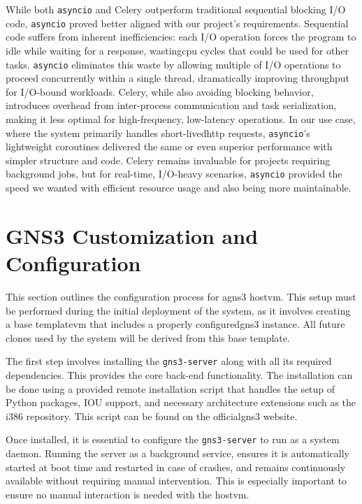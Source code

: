         While both \texttt{asyncio} and Celery outperform traditional sequential blocking I/O code, \texttt{asyncio} proved better 
        aligned with our project's requirements. Sequential code suffers from inherent inefficiencies: each I/O 
        operation forces the program to idle while waiting for a response, wasting\ac{cpu} cycles that could be used 
        for other tasks. \texttt{asyncio} eliminates this waste by allowing multiple of I/O operations to proceed 
        concurrently within a single thread, dramatically improving throughput for I/O-bound workloads. Celery, 
        while also avoiding blocking behavior, introduces overhead from inter-process communication and task 
        serialization, making it less optimal for high-frequency, low-latency operations. In our use case, where the 
        system primarily handles short-lived\ac{http} requests, \texttt{asyncio}'s lightweight coroutines delivered the same 
        or even superior performance with simpler structure and code. Celery remains invaluable for projects requiring  
        background jobs, but for real-time, I/O-heavy scenarios, \texttt{asyncio} provided the speed we wanted with efficient resource usage and 
        also being more maintainable.

\section{GNS3 Customization and Configuration}

    This section outlines the configuration process for a\ac{gns3} host\ac{vm}. This setup must be performed during the initial 
    deployment of the system, as it involves creating a base template\ac{vm} that includes a properly configured\ac{gns3} instance. 
    All future clones used by the system will be derived from this base template.

    The first step involves installing the \texttt{gns3-server} along with all its required dependencies. This provides the 
    core back-end functionality. The installation can be done using a provided remote installation script that handles the 
    setup of Python packages, IOU support, and necessary architecture extensions such as the i386 repository. 
    This script can be found on the official\ac{gns3} website.

    Once installed, it is essential to configure the \texttt{gns3-server} to run as a system daemon. Running the server as 
    a background service, ensures it is automatically started at boot time and restarted in case of crashes, and remains 
    continuously available without requiring manual intervention. This is especially important to ensure no manual interaction 
    is needed with the host\ac{vm}.

